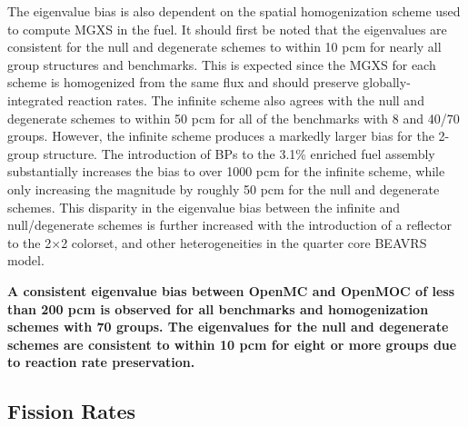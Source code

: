 
The eigenvalue bias is also dependent on the spatial homogenization scheme used to compute \ac{MGXS} in the fuel. It should first be noted that the eigenvalues are consistent for the null and degenerate schemes to within 10 \ac{pcm} for nearly all group structures and benchmarks. This is expected since the \ac{MGXS} for each scheme is homogenized from the same flux and should preserve globally-integrated reaction rates. The infinite scheme also agrees with the null and degenerate schemes to within 50 \ac{pcm} for all of the benchmarks with 8 and 40/70 groups. However, the infinite scheme produces a markedly larger bias for the 2-group structure. The introduction of \acp{BP} to the 3.1\% enriched fuel assembly substantially increases the bias to over 1000 \ac{pcm} for the infinite scheme, while only increasing the magnitude by roughly 50 \ac{pcm} for the null and degenerate schemes. This disparity in the eigenvalue bias between the infinite and null/degenerate schemes is further increased with the introduction of a reflector to the 2$\times$2 colorset, and other heterogeneities in the quarter core \ac{BEAVRS} model.


\begin{emphbox}
\textbf{A consistent eigenvalue bias between OpenMC and OpenMOC of less than 200 \ac{pcm} is observed for all benchmarks and homogenization schemes with 70 groups. The eigenvalues for the null and degenerate schemes are consistent to within 10 \ac{pcm} for eight or more groups due to reaction rate preservation.}
\end{emphbox}

\subsection{Fission Rates}
\label{subsec:chap8-fiss-rates}

